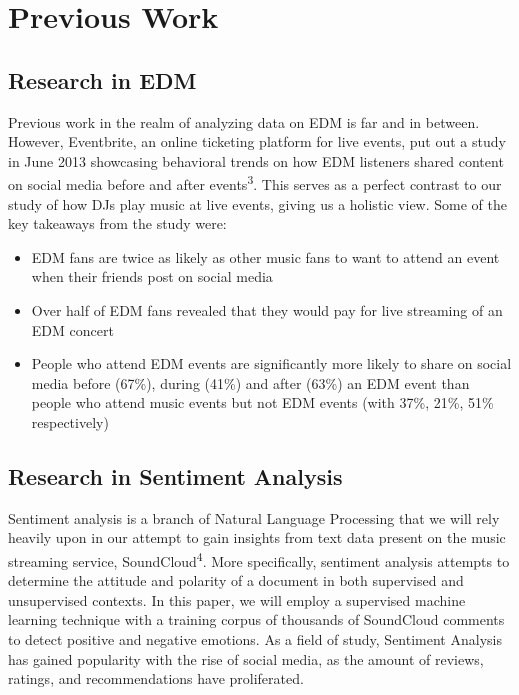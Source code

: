 \documentclass[12pt]{dalcsthesis}
\begin{document}
\chapter{Previous Work}

\section{Research in EDM}

Previous work in the realm of analyzing data on EDM is far and in between. However, Eventbrite, an online ticketing platform for live events, put out a study in June 2013 showcasing behavioral trends on how EDM listeners shared content on social media before and after events\textsuperscript{3}. This serves as a perfect contrast to our study of how DJs play music at live events, giving us a holistic view. Some of the key takeaways from the study were:

\begin{itemize}
  \item EDM fans are twice as likely as other music fans to want to attend an event when their friends post on social media
  \item Over half of EDM fans revealed that they would pay for live streaming of an EDM concert
  \item People who attend EDM events are significantly more likely to share on social media before (67\%), during (41\%) and after (63\%) an EDM event than people who attend music events but not EDM events (with 37\%, 21\%, 51\% respectively)
\end{itemize}

\section{Research in Sentiment Analysis}
Sentiment analysis is a branch of Natural Language Processing that we will rely heavily upon in our attempt to gain insights from text data present on the music streaming service, SoundCloud\textsuperscript{4}. More specifically, sentiment analysis attempts to determine the attitude and polarity of a document in both supervised and unsupervised contexts. In this paper, we will employ a supervised machine learning technique with a training corpus of thousands of SoundCloud comments to detect positive and negative emotions. As a field of study, Sentiment Analysis has gained popularity with the rise of social media, as the amount of reviews, ratings, and recommendations have proliferated.
\end{document}
